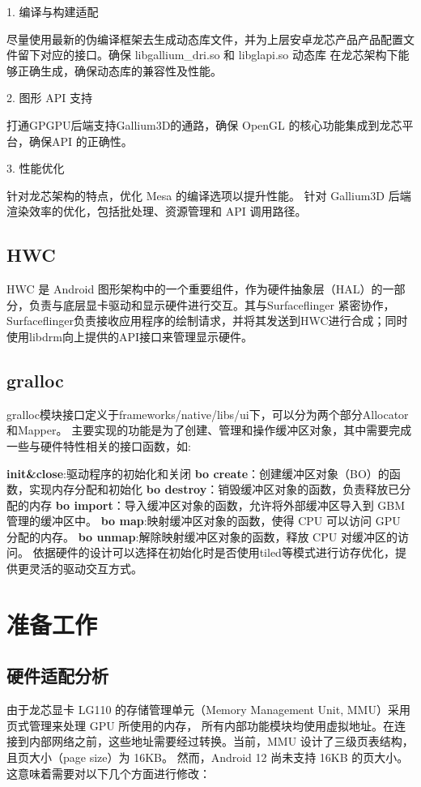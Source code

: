 1. 编译与构建适配

尽量使用最新的伪编译框架去生成动态库文件，并为上层安卓龙芯产品产品配置文件留下对应的接口。确保 libgallium\_dri.so 和 libglapi.so 动态库
在龙芯架构下能够正确生成，确保动态库的兼容性及性能。

2. 图形 API 支持

打通GPGPU后端支持Gallium3D的通路，确保 OpenGL 的核心功能集成到龙芯平台，确保API 的正确性。

3. 性能优化

针对龙芯架构的特点，优化 Mesa 的编译选项以提升性能。
针对 Gallium3D 后端渲染效率的优化，包括批处理、资源管理和 API 调用路径。

\subsection{HWC}
HWC 是 Android 图形架构中的一个重要组件，作为硬件抽象层（HAL）的一部分，负责与底层显卡驱动和显示硬件进行交互。其与Surfaceflinger
紧密协作，Surfaceflinger负责接收应用程序的绘制请求，并将其发送到HWC进行合成；同时使用libdrm向上提供的API接口来管理显示硬件。

\subsection{gralloc}
gralloc模块接口定义于frameworks/native/libs/ui下，可以分为两个部分Allocator和Mapper。
主要实现的功能是为了创建、管理和操作缓冲区对象，其中需要完成一些与硬件特性相关的接口函数，如:

\textbf{init\&close}:驱动程序的初始化和关闭
\textbf{bo create}：创建缓冲区对象（BO）的函数，实现内存分配和初始化
\textbf{bo destroy}：销毁缓冲区对象的函数，负责释放已分配的内存
\textbf{bo import}：导入缓冲区对象的函数，允许将外部缓冲区导入到 GBM 管理的缓冲区中。
\textbf{bo map}:映射缓冲区对象的函数，使得 CPU 可以访问 GPU 分配的内存。
\textbf{bo unmap}:解除映射缓冲区对象的函数，释放 CPU 对缓冲区的访问。
依据硬件的设计可以选择在初始化时是否使用tiled等模式进行访存优化，提供更灵活的驱动交互方式。

\section{准备工作}

\subsection{硬件适配分析}
由于龙芯显卡 LG110 的存储管理单元（Memory Management Unit, MMU）采用页式管理来处理 GPU 所使用的内存，
所有内部功能模块均使用虚拟地址。在连接到内部网络之前，这些地址需要经过转换。当前，MMU 设计了三级页表结构，且页大小（page size）为 16KB。
然而，Android 12 尚未支持 16KB 的页大小。这意味着需要对以下几个方面进行修改：

